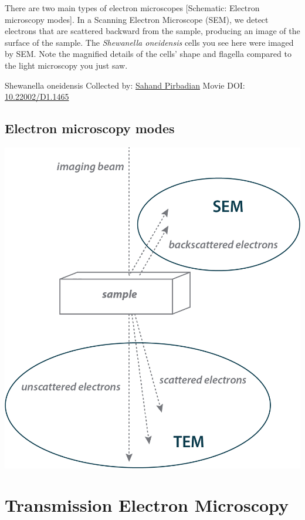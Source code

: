 \documentclass[]{tufte-book}
\begin{document}
There are two main types of electron microscopes {[}Schematic: Electron microscopy modes{]}. In a Scanning Electron Microscope (SEM), we detect electrons that are scattered backward from the sample, producing an image of the surface of the sample. The \emph{Shewanella oneidensis} cells you see here were imaged by SEM. Note the magnified details of the cells' shape and flagella compared to the light microscopy you just saw.



\hypertarget{htmlwidget-c3b5a6da16f0c490f33d}{}

\label{fig:1-3}Shewanella oneidensis Collected by: \protect\hyperlink{sahand_pirbadian}{Sahand Pirbadian} Movie DOI: \href{https://doi.org/10.22002/D1.1465}{10.22002/D1.1465}

\hypertarget{Electron_microscopy_modes}{%
\subsection{Electron microscopy modes}\label{Electron_microscopy_modes}}

\includegraphics{img/schematics/1_3_1}

\hypertarget{transmission-electron-microscopy}{%
\section{Transmission Electron Microscopy}\label{transmission-electron-microscopy}}
\end{document}
